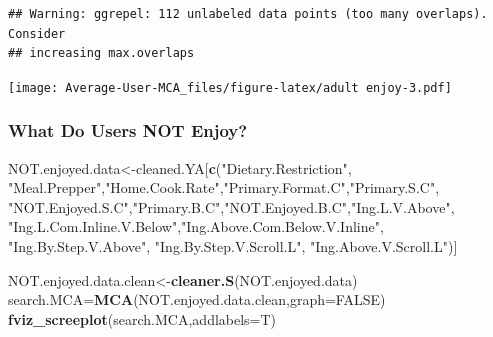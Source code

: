 \documentclass[
]{article}
\newenvironment{Shaded}{\begin{snugshade}}{\end{snugshade}}
\newcommand{\DataTypeTok}[1]{\textcolor[rgb]{0.13,0.29,0.53}{#1}}
\newcommand{\KeywordTok}[1]{\textcolor[rgb]{0.13,0.29,0.53}{\textbf{#1}}}
\newcommand{\NormalTok}[1]{#1}
\newcommand{\OtherTok}[1]{\textcolor[rgb]{0.56,0.35,0.01}{#1}}
\newcommand{\StringTok}[1]{\textcolor[rgb]{0.31,0.60,0.02}{#1}}
\begin{document}
\begin{Shaded}
\end{Shaded}

\begin{verbatim}
## Warning: ggrepel: 112 unlabeled data points (too many overlaps). Consider
## increasing max.overlaps
\end{verbatim}

\texttt{[image: Average-User-MCA\_files/figure-latex/adult enjoy-3.pdf]}

\hypertarget{what-do-users-not-enjoy-2}{%
\subsubsection{What Do Users NOT
Enjoy?}\label{what-do-users-not-enjoy-2}}

\begin{Shaded}
\begin{Highlighting}[]
\NormalTok{NOT.enjoyed.data<-cleaned.YA[}\KeywordTok{c}\NormalTok{(}\StringTok{"Dietary.Restriction"}\NormalTok{, }\StringTok{"Meal.Prepper"}\NormalTok{,}\StringTok{"Home.Cook.Rate"}\NormalTok{,}\StringTok{"Primary.Format.C"}\NormalTok{,}\StringTok{"Primary.S.C"}\NormalTok{,}
            \StringTok{"NOT.Enjoyed.S.C"}\NormalTok{,}\StringTok{"Primary.B.C"}\NormalTok{,}\StringTok{"NOT.Enjoyed.B.C"}\NormalTok{,}\StringTok{"Ing.L.V.Above"}\NormalTok{,}
            \StringTok{"Ing.L.Com.Inline.V.Below"}\NormalTok{,}\StringTok{"Ing.Above.Com.Below.V.Inline"}\NormalTok{,  }\StringTok{"Ing.By.Step.V.Above"}\NormalTok{,  }\StringTok{"Ing.By.Step.V.Scroll.L"}\NormalTok{,}
            \StringTok{"Ing.Above.V.Scroll.L"}\NormalTok{)]}

\NormalTok{NOT.enjoyed.data.clean<-}\KeywordTok{cleaner.S}\NormalTok{(NOT.enjoyed.data)}
\NormalTok{search.MCA=}\KeywordTok{MCA}\NormalTok{(NOT.enjoyed.data.clean,}\DataTypeTok{graph=}\OtherTok{FALSE}\NormalTok{)}
\KeywordTok{fviz_screeplot}\NormalTok{(search.MCA,}\DataTypeTok{addlabels=}\NormalTok{T)}
\end{Highlighting}
\end{Shaded}
\end{document}

